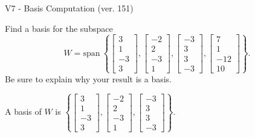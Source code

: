 \begin{exercise}
  \begin{exerciseTitle}V7 - Basis Computation (ver. 151)\end{exerciseTitle}
  \begin{exerciseStatement}
    Find a basis for the subspace 
\[W=\mathrm{span}\ \left\{\left[\begin{array}{r}
3 \\
1 \\
-3 \\
3
\end{array}\right] , \left[\begin{array}{r}
-2 \\
2 \\
-3 \\
1
\end{array}\right] , \left[\begin{array}{r}
-3 \\
3 \\
3 \\
-3
\end{array}\right] , \left[\begin{array}{r}
7 \\
1 \\
-12 \\
10
\end{array}\right]\right\}.\]
 Be sure to explain why your result is a basis.


  \end{exerciseStatement}
  \begin{exerciseAnswer}
   A basis of \(W\) is  \(\left\{\left[\begin{array}{r}
3 \\
1 \\
-3 \\
3
\end{array}\right] , \left[\begin{array}{r}
-2 \\
2 \\
-3 \\
1
\end{array}\right] , \left[\begin{array}{r}
-3 \\
3 \\
3 \\
-3
\end{array}\right]\right\}\).
  


  \end{exerciseAnswer}
\end{exercise}